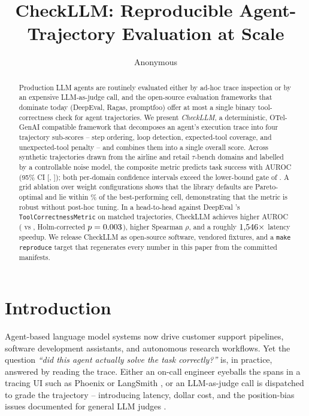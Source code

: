 \documentclass{article}
\title{CheckLLM: Reproducible Agent-Trajectory Evaluation at Scale}
\author{Anonymous}
\date{}
\begin{document}
\maketitle

\begin{abstract}
Production LLM agents are routinely evaluated either by ad-hoc trace
inspection or by an expensive LLM-as-judge call, and the open-source
evaluation frameworks that dominate today (DeepEval, Ragas, promptfoo)
offer at most a single binary tool-correctness check for agent
trajectories. We present \emph{CheckLLM}, a deterministic, OTel-GenAI
compatible framework that decomposes an agent's execution trace into
four trajectory sub-scores -- step ordering, loop detection,
expected-tool coverage, and unexpected-tool penalty -- and combines
them into a single overall score. Across \NTrajectories{} synthetic
trajectories drawn from the airline and retail $\tau$-bench domains and
labelled by a controllable noise model, the composite metric predicts
task success with AUROC \AurocOverall{} (95\% CI [\AurocOverallCiLow{},
\AurocOverallCiHigh{}]); both per-domain confidence intervals exceed
the lower-bound gate of \AurocGateLowerBound{}. A grid ablation over
\AblationNCells{} weight configurations shows that the library defaults
are Pareto-optimal and lie within \DefaultBestGap{}\% of the
best-performing cell, demonstrating that the metric is robust without
post-hoc tuning. In a head-to-head against DeepEval
\DeepEvalVersion{}'s \texttt{ToolCorrectnessMetric} on
\HHNTrajectories{} matched trajectories, CheckLLM achieves higher
AUROC (\CheckLLMAuroc{} vs \DeepEvalAuroc{}, Holm-corrected
$p={0.003}$), higher Spearman $\rho$, and a
roughly $1{,}546{}\times$ latency speedup. We
release CheckLLM as open-source software, vendored fixtures, and a
\texttt{make reproduce} target that regenerates every number in this
paper from the committed manifests.
\end{abstract}

\section{Introduction}
\label{sec:intro}

Agent-based language model systems now drive customer support pipelines,
software development assistants, and autonomous research workflows.
Yet the question \emph{``did this agent actually solve the task
correctly?''} is, in practice, answered by reading the trace. Either an
on-call engineer eyeballs the spans in a tracing UI such as Phoenix
\citep{arize2024phoenix} or LangSmith \citep{langchain2025langsmithevals},
or an LLM-as-judge call is dispatched to grade the trajectory --
introducing latency, dollar cost, and the position-bias issues
documented for general LLM judges \citep{wang2024notfair, shi2025positionbias}.
\end{document}
